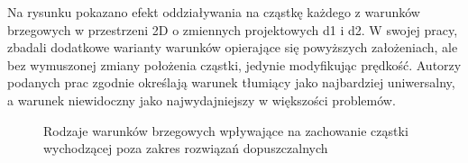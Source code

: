 Na rysunku pokazano efekt oddziaływania na cząstkę każdego z warunków brzegowych w przestrzeni 2D o zmiennych projektowych d1 i d2. W swojej pracy, \parencite{Xu2007} zbadali dodatkowe warianty warunków opierające się powyższych założeniach, ale bez wymuszonej zmiany położenia cząstki, jedynie modyfikując prędkość. Autorzy podanych prac zgodnie określają warunek tłumiący jako najbardziej uniwersalny, a warunek niewidoczny jako najwydajniejszy w większości problemów.
\begin{figure}[h]
	\centering
	\captionsetup{justification=centering}
	\caption{Rodzaje warunków brzegowych wpływające na zachowanie cząstki wychodzącej poza zakres rozwiązań dopuszczalnych}
	\label{fig: pso_bounds_types}
\end{figure}
